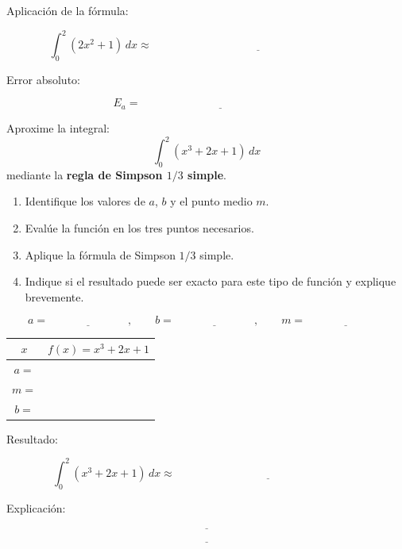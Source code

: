 \documentclass[10pt,respuestas,a4]{aleph-examen}
\begin{document}
\begin{preguntas}
Aplicación de la fórmula:

\[
\int_0^2 (2x^2+1)\,dx
\approx
\underline{\hspace{8cm}}
\]

Error absoluto:

\[
E_a=\underline{\hspace{6cm}}
\]


\item
Aproxime la integral: 
\[
\int_0^2 (x^3+2x+1)\,dx
\]
mediante la \textbf{regla de Simpson $1/3$ simple}.

\begin{enumerate}[label=\alph*)]
    \item Identifique los valores de $a$, $b$ y el punto medio $m$.
    \item Evalúe la función en los tres puntos necesarios.
    \item Aplique la fórmula de Simpson $1/3$ simple.
    \item Indique si el resultado puede ser exacto para este tipo de función y explique brevemente.
\end{enumerate}

\[
a=\underline{\hspace{3cm}},
\qquad
b=\underline{\hspace{3cm}},
\qquad
m=\underline{\hspace{3cm}}
\]

\begin{center}
\renewcommand{\arraystretch}{1.4}
\begin{tabular}{c|c}
\toprule
$x$ & $f(x)=x^3+2x+1$ \\
\midrule
$a=$ &  \\
$m=$ &  \\
$b=$ &  \\
\bottomrule
\end{tabular}
\end{center}

Resultado:

\[
\int_0^2 (x^3+2x+1)\,dx
\approx
\underline{\hspace{7cm}}
\]

Explicación:

\[
\underline{\hspace{14cm}}
\]

\[
\underline{\hspace{14cm}}
\]


\end{preguntas}
\end{document}

